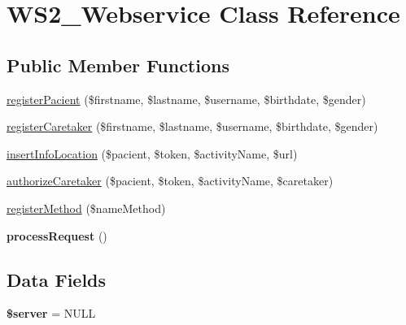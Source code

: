\hypertarget{class_w_s2___webservice}{\section{W\+S2\+\_\+\+Webservice Class Reference}
\label{class_w_s2___webservice}
}
\subsection*{Public Member Functions}
\begin{DoxyCompactItemize}
\item 
\hyperlink{class_w_s2___webservice_a94e3fd34f1e7778d69013bc3ac57a1d7}{register\+Pacient} (\$firstname, \$lastname, \$username, \$birthdate, \$gender)
\item 
\hyperlink{class_w_s2___webservice_a3bd4c38e0625889172f441a6c637cc42}{register\+Caretaker} (\$firstname, \$lastname, \$username, \$birthdate, \$gender)
\item 
\hyperlink{class_w_s2___webservice_adb7e6ca2d6bbdfa55a7ccb60c5ce549e}{insert\+Info\+Location} (\$pacient, \$token, \$activity\+Name, \$url)
\item 
\hyperlink{class_w_s2___webservice_ab8824cfa47f27b3ea470c4ceaff1ad99}{authorize\+Caretaker} (\$pacient, \$token, \$activity\+Name, \$caretaker)
\item 
\hyperlink{class_w_s2___webservice_ab93521bcae8c90f705635a5788ce1def}{register\+Method} (\$name\+Method)
\item 
\hypertarget{class_w_s2___webservice_a3c934047380a0debb627d77d51bb85c8}{{\bfseries process\+Request} ()}\label{class_w_s2___webservice_a3c934047380a0debb627d77d51bb85c8}

\end{DoxyCompactItemize}
\subsection*{Data Fields}
\begin{DoxyCompactItemize}
\item 
\hypertarget{class_w_s2___webservice_ad135cc8a47e55f0829949cf62214170f}{{\bfseries \$server} = N\+U\+L\+L}\label{class_w_s2___webservice_ad135cc8a47e55f0829949cf62214170f}

\end{DoxyCompactItemize}


